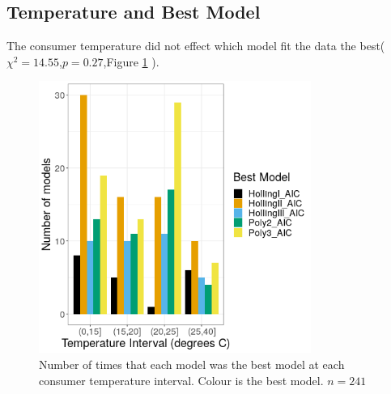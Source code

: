 \documentclass{article}
\begin{document}
\subsection{Temperature and Best Model}
The consumer temperature did not effect which model fit the data the best($\chi^2=14.55$,$p=0.27$,Figure  \ref{fig:tempmodel} ).
\begin{figure}[h!] %
    \centering
    \includegraphics[width=3.5in]{../Results/Plots/tempmodel.png}
    \caption{Number of times that each model was the best model at each consumer temperature interval. Colour is the best model. $n=241$}
    \label{fig:tempmodel}
\end{figure}
\end{document}
